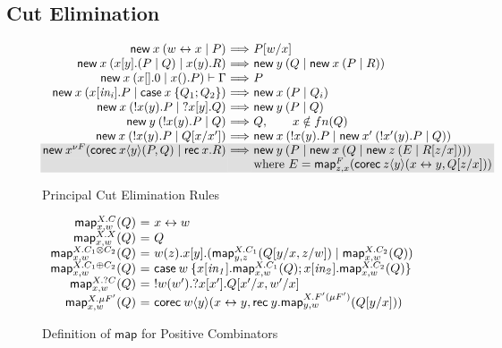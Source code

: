 \documentclass[orivec,envcountsame]{llncs}
\makeatletter
\newcommand{\cpdual}[1]{#1^\perp}
\newcommand{\cpbang}[1]{{! #1}}
\newcommand{\cpquery}[1]{{? #1}}
\newcommand{\cptyp}[2]{#1 \vdash #2}
\newcommand{\mapname}{\mathsf{map}}
\newcommand{\map}[3]{\mapname^{#1}_{#2}(#3)}
\newcommand{\mkwd}[1]{\mathsf{#1}}
\newcommand{\link}[2]{#1 \leftrightarrow #2}
\newcommand{\cut}[4]{\mkwd{new}\:#1 \: (#3 \mid #4)}
\newcommand{\replicate}[2]{{!#1(#2)}}
\newcommand{\derelict}[2]{{?#1[#2]}}
\newcommand{\rec}[1]{\mkwd{rec}\:#1}
\newcommand{\corec}[5]{\mkwd{corec}\:#1 \langle #2 \rangle (#4,#5)}
\newcommand{\clabel}[1]{\mathit{#1}}
\renewcommand{\case}[2]{\mkwd{case}\:#1\:\{#2\}}
\newcommand{\sel}[2]{#1[\clabel{#2}]}
\newcommand{\key}{\mkwd}
\newcommand{\ba}{\begin{array}}
\newcommand{\ea}{\end{array}}
\newenvironment{equations}{\[\ba{@{}r@{~}c@{~}l@{}}}{\ea\]}
\newcommand\shaderow{\noalign{\vskip-0.4pt}\rowcolor{shade}[0.6mm]}
\makeatother
\begin{document}
\subsection{Cut Elimination}

\begin{figure}[float]\small
\begin{equations}
\cut{x}{A}{\link{w}{x}}{P}
  &\Longrightarrow& P[w/x] \\
\cut{x}{A \otimes B}{x[y].(P \mid Q)}{x(y).R}
  &\Longrightarrow&
    \cut{y}{A}{Q}{\cut{x}{B}{P}{R}} \\
\cptyp{\cut{x}{1}{x[].0}{x().P}}{\Gamma}
  &\Longrightarrow&
    P \\
\cut{x}{A \oplus B}{\sel{x}{in_i}.P}{\case{x}{Q_1; Q_2}}
  &\Longrightarrow&
    \cut{x}{A}{P}{Q_i} \\
\cut{x}{\cpbang{A}}{\replicate{x}{y}.P}{\derelict{x}{y}.Q}
  &\Longrightarrow&
    \cut{y}{A}{P}{Q} \\
\cut{y}{\cpbang{A}}{\replicate{x}{y}.P}{Q}
  &\Longrightarrow&
     Q, \qquad x \notin fn(Q) \\
\cut{x}{\cpbang{A}}{\replicate{x}{y}.P}{Q[x/x']}
  &\Longrightarrow&
    \cut{x}{\cpbang{A}}{\replicate{x}{y}.P}{\cut{x'}{\cpbang{A}}{\replicate{x'}{y}.P}{Q}} \\ \shaderow
\key{new}\:x^{\nu F} %
  (\corec{x}{y}{B}{P}{Q} \mid \rec{x}.R)
  &\Longrightarrow&
    \cut{y}{B}{P}{\cut{x}{F(B)}{Q}{\cut{z}{F(\nu F)}{E}{R[z/x]}}} \\ \shaderow
&& \text{where }E = \map{F}{z,x}{\corec{z}{y}{B}{\link{x}{y}}{Q[z/x]}}
\end{equations}%
\caption{Principal Cut Elimination Rules}\label{fig:beta-reduction}
\end{figure}



\begin{figure}[float]
\small
\begin{equations}
  \map{X.C}{x,w}{Q} &=& \link{x}{w} \\
  \map{X.X}{x,w}{Q} &=& Q \\
  \map{X.C_1 \otimes C_2}{x,w}{Q} &=& w(z).x[y].(\map{X.C_1}{y,z}{Q[y/x,z/w]} \mid \map{X.C_2}{x,w}{Q}) \\
  \map{X.C_1 \oplus C_2}{x,w}{Q} &=&
    \case{w}{\sel{x}{in_1}.\map{X.C_1}{x,w}{Q}; \sel{x}{in_2}.\map{X.C_2}{x,w}{Q}} \\
  \map{X.\cpquery{C}}{x,w}{Q} &=& \replicate{w}{w'}.\derelict{x}{x'}.Q[x'/x,w'/x] \\
  \map{X.\mu F'}{x,w}{Q} &=& \corec{w}{y}{\nu(\cpdual{C}(A))}{\link{x}{y}}{\rec{y}.\map{X.F' (\mu F')}{y,w}{Q[y/x]}}
\end{equations}
\caption{Definition of $\mapname$ for Positive Combinators}\label{fig:map}
\end{figure}
\end{document}
